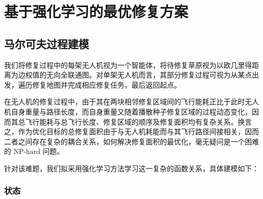 \documentclass[AutoFakeBold]{LZUThesis}
\begin{document}

\chapter{基于强化学习的最优修复方案}

\section{马尔可夫过程建模}
我们将修复过程中的每架无人机视为一个智能体，将待修复草原视为以欧几里得距离为边权值的无向全联通图。对单架无人机而言，其部分修复过程可视为从某点出发，遍历修复地图并完成相应修复任务，最后返回起点。

在无人机的修复过程中，由于其在两块相邻修复区域间的飞行能耗正比于此时无人机自身重量与路径长度，而自身重量又随着播散种子修复区域的过程动态变化，因而其总飞行能耗与总飞行长度、修复区域的顺序及修复面积均有复杂关系。换言之，作为优化目标的总修复面积由于与无人机耗能而与其飞行路径间接相关，因而二者之间存在复杂的耦合关系，如何解决修复面积的最优化，毫无疑问是一个困难的 $\text{NP-hard}$ 问题。

针对该难题，我们拟采用强化学习方法学习这一复杂的函数关系，具体建模如下：

\subsection{状态}
\end{document}
